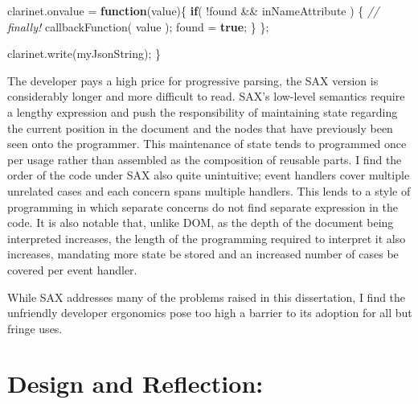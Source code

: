 \documentclass[12pt, ]{article}
\let\stdsection\section
\renewcommand\section{\newpage\stdsection}
\newenvironment{Shaded}{}{}
\newcommand{\KeywordTok}[1]{\textcolor[rgb]{0.00,0.44,0.13}{\textbf{{#1}}}}
\newcommand{\CommentTok}[1]{\textcolor[rgb]{0.38,0.63,0.69}{\textit{{#1}}}}
\newcommand{\OtherTok}[1]{\textcolor[rgb]{0.00,0.44,0.13}{{#1}}}
\newcommand{\FunctionTok}[1]{\textcolor[rgb]{0.02,0.16,0.49}{{#1}}}
\newcommand{\NormalTok}[1]{{#1}}
\begin{document}
\begin{Shaded}
\begin{Highlighting}[]
   \OtherTok{clarinet}\NormalTok{.}\FunctionTok{onvalue} \NormalTok{= }\KeywordTok{function}\NormalTok{(value)\{}
      \KeywordTok{if}\NormalTok{( !found && inNameAttribute ) \{}
         \CommentTok{// finally!}
         \FunctionTok{callbackFunction}\NormalTok{( value );}
         \NormalTok{found = }\KeywordTok{true}\NormalTok{;}
      \NormalTok{\}}
   \NormalTok{\};      }
   
   \OtherTok{clarinet}\NormalTok{.}\FunctionTok{write}\NormalTok{(myJsonString);   }
\NormalTok{\}}
\end{Highlighting}
\end{Shaded}

The developer pays a high price for progressive parsing, the SAX version
is considerably longer and more difficult to read. SAX's low-level
semantics require a lengthy expression and push the responsibility of
maintaining state regarding the current position in the document and the
nodes that have previously been seen onto the programmer. This
maintenance of state tends to programmed once per usage rather than
assembled as the composition of reusable parts. I find the order of the
code under SAX also quite unintuitive; event handlers cover multiple
unrelated cases and each concern spans multiple handlers. This lends to
a style of programming in which separate concerns do not find separate
expression in the code. It is also notable that, unlike DOM, as the
depth of the document being interpreted increases, the length of the
programming required to interpret it also increases, mandating more
state be stored and an increased number of cases be covered per event
handler.

While SAX addresses many of the problems raised in this dissertation, I
find the unfriendly developer ergonomics pose too high a barrier to its
adoption for all but fringe uses.

\section{Design and Reflection:}\label{design-and-reflection}
\end{document}
